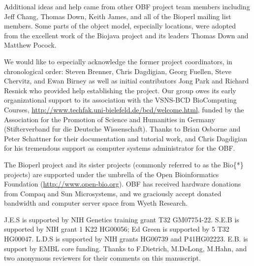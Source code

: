 \documentclass[12pt]{article}
\begin{document}
Additional ideas and help came from other OBF project team members
including Jeff Chang, Thomas Down, Keith James, and all of the Bioperl
mailing list members.  Some parts of the object model, especially
locations, were adopted from the excellent work of the Biojava project
and its leaders Thomas Down and Matthew Pocock.


% 

We would like to especially acknowledge the former project
coordinators, in chronological order: Steven Brenner, Chris Dagdigian,
Georg Fuellen, Steve Chervitz, and Ewan Birney as well as initial
contributors Jong Park and Richard Resnick who provided help
establishing the project.  Our group owes its early organizational
support to its association with the VSNS-BCD BioComputing Courses,
\url{http://www.techfak.uni-bielefeld.de/bcd/welcome.html}, funded by
the Association for the Promotion of Science and Humanities in Germany
(Stifterverband fur die Deutsche Wissenschaft).  Thanks to Brian
Osborne and Peter Schattner for their documentation and tutorial work,
and Chris Dagdigian for his tremendous support as computer systems
administrator for the OBF.

The Bioperl project and its sister projects (commonly referred to as
the Bio\{*\} projects) are supported under the umbrella of the Open
Bioinformatics Foundation (\url{http://www.open-bio.org}).  OBF has
received hardware donations from Compaq and Sun Microsystems, and we
graciously accept donated bandwidth and computer server space from
Wyeth Research.

J.E.S is supported by NIH Genetics training grant T32 GM07754-22.
S.E.B is supported by NIH grant 1 K22 HG00056; Ed Green is supported
by 5 T32 HG00047.  L.D.S is supported by NIH grants HG00739 and
P41HG02223.  E.B. is support by EMBL core funding.  Thanks to
F.Dietrich, M.DeLong, M.Hahn, and two anonymous reviewers for their
comments on this manuscript.


 
\end{document}
